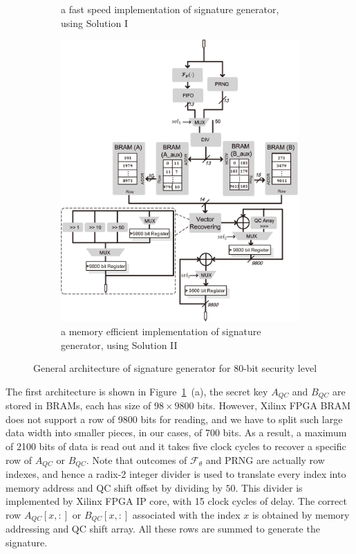 \documentclass[10pt,journal,compsoc]{IEEEtran}
\begin{document}
\begin{figure}[!htb]
\begin{subfigure}{.38\textwidth}
\caption{ a fast speed implementation of signature generator, using Solution I}
\end{subfigure}
\hfill
\begin{subfigure}{.55\textwidth}\centering
\includegraphics[width=\textwidth]{./fig/siggen-v2.eps}
\caption{a memory efficient implementation of signature generator, using Solution II}
\end{subfigure}
\caption{General architecture of signature generator for 80-bit security level}
\label{fig:siggen}
\end{figure}

The first architecture is shown in Figure~\ref{fig:siggen}~(a), the secret key $A_{QC}$ and $B_{QC}$ are stored in BRAMs, each has size of $98\times 9800$ bits. However, Xilinx FPGA BRAM does not support a row of 9800 bits for reading, and we have to split such large data width into smaller pieces, in our cases, of 700 bits. As a result, a maximum of 2100 bits of data is read out and it takes five clock cycles to recover a specific row of $A_{QC}$ or $B_{QC}$. Note that outcomes of $\mathcal{F}_{\theta}$ and PRNG are actually row indexes, and hence a radix-2 integer divider is used to translate every index into memory address and QC shift offset by dividing by $50$. This divider is implemented by Xilinx FPGA
IP core, with 15 clock cycles of delay. The correct row $A_{QC}[x,:]$ or $B_{QC}[x,:]$ associated with the index $x$ is obtained by memory addressing and QC shift array. All these rows are summed to generate the signature.
\end{document}
